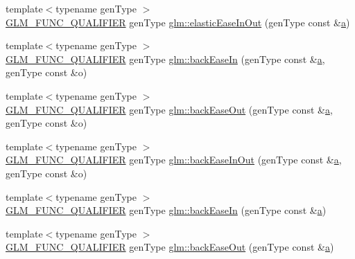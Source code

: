 \begin{DoxyCompactItemize}
\item 
{\footnotesize template$<$typename gen\+Type $>$ }\\\hyperlink{setup_8hpp_a33fdea6f91c5f834105f7415e2a64407}{G\+L\+M\+\_\+\+F\+U\+N\+C\+\_\+\+Q\+U\+A\+L\+I\+F\+I\+ER} gen\+Type \hyperlink{group__gtx__easing_ga2db4ac8959559b11b4029e54812908d6}{glm\+::elastic\+Ease\+In\+Out} (gen\+Type const \&\hyperlink{_s_d_l__opengl__glext_8h_a3309789fc188587d666cda5ece79cf82}{a})
\item 
{\footnotesize template$<$typename gen\+Type $>$ }\\\hyperlink{setup_8hpp_a33fdea6f91c5f834105f7415e2a64407}{G\+L\+M\+\_\+\+F\+U\+N\+C\+\_\+\+Q\+U\+A\+L\+I\+F\+I\+ER} gen\+Type \hyperlink{group__gtx__easing_ga33777c9dd98f61d9472f96aafdf2bd36}{glm\+::back\+Ease\+In} (gen\+Type const \&\hyperlink{_s_d_l__opengl__glext_8h_a3309789fc188587d666cda5ece79cf82}{a}, gen\+Type const \&o)
\item 
{\footnotesize template$<$typename gen\+Type $>$ }\\\hyperlink{setup_8hpp_a33fdea6f91c5f834105f7415e2a64407}{G\+L\+M\+\_\+\+F\+U\+N\+C\+\_\+\+Q\+U\+A\+L\+I\+F\+I\+ER} gen\+Type \hyperlink{group__gtx__easing_ga640c1ac6fe9d277a197da69daf60ee4f}{glm\+::back\+Ease\+Out} (gen\+Type const \&\hyperlink{_s_d_l__opengl__glext_8h_a3309789fc188587d666cda5ece79cf82}{a}, gen\+Type const \&o)
\item 
{\footnotesize template$<$typename gen\+Type $>$ }\\\hyperlink{setup_8hpp_a33fdea6f91c5f834105f7415e2a64407}{G\+L\+M\+\_\+\+F\+U\+N\+C\+\_\+\+Q\+U\+A\+L\+I\+F\+I\+ER} gen\+Type \hyperlink{group__gtx__easing_ga68a7b760f2afdfab298d5cd6d7611fb1}{glm\+::back\+Ease\+In\+Out} (gen\+Type const \&\hyperlink{_s_d_l__opengl__glext_8h_a3309789fc188587d666cda5ece79cf82}{a}, gen\+Type const \&o)
\item 
{\footnotesize template$<$typename gen\+Type $>$ }\\\hyperlink{setup_8hpp_a33fdea6f91c5f834105f7415e2a64407}{G\+L\+M\+\_\+\+F\+U\+N\+C\+\_\+\+Q\+U\+A\+L\+I\+F\+I\+ER} gen\+Type \hyperlink{group__gtx__easing_ga93cddcdb6347a44d5927cc2bf2570816}{glm\+::back\+Ease\+In} (gen\+Type const \&\hyperlink{_s_d_l__opengl__glext_8h_a3309789fc188587d666cda5ece79cf82}{a})
\item 
{\footnotesize template$<$typename gen\+Type $>$ }\\\hyperlink{setup_8hpp_a33fdea6f91c5f834105f7415e2a64407}{G\+L\+M\+\_\+\+F\+U\+N\+C\+\_\+\+Q\+U\+A\+L\+I\+F\+I\+ER} gen\+Type \hyperlink{group__gtx__easing_gabf25069fa906413c858fd46903d520b9}{glm\+::back\+Ease\+Out} (gen\+Type const \&\hyperlink{_s_d_l__opengl__glext_8h_a3309789fc188587d666cda5ece79cf82}{a})

\end{DoxyCompactItemize}
